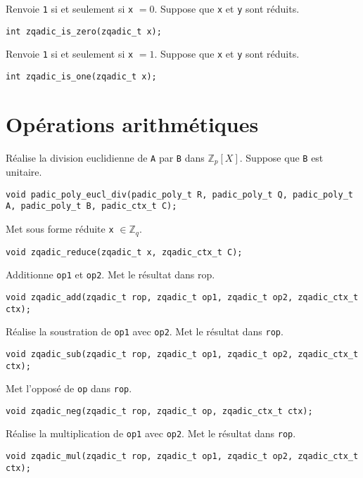 \documentclass[11pt]{article}
\begin{document}
Renvoie \texttt{1} si et seulement si \texttt{x} $= 0$. Suppose que \texttt{x} et \texttt{y} sont réduits.
\begin{verbatim}
int zqadic_is_zero(zqadic_t x);
\end{verbatim}

Renvoie \texttt{1} si et seulement si \texttt{x} $= 1$. Suppose que \texttt{x} et \texttt{y} sont réduits.
\begin{verbatim}
int zqadic_is_one(zqadic_t x);
\end{verbatim}


\section{Opérations arithmétiques}

Réalise la division euclidienne de \texttt{A} par \texttt{B} dans $\mathbb{Z}_p[X]$. Suppose que \texttt{B} est unitaire.
\begin{verbatim}
void padic_poly_eucl_div(padic_poly_t R, padic_poly_t Q, padic_poly_t A, padic_poly_t B, padic_ctx_t C);
\end{verbatim}

Met sous forme réduite \texttt{x} $\in \mathbb{Z}_q$.
\begin{verbatim}
void zqadic_reduce(zqadic_t x, zqadic_ctx_t C);
\end{verbatim}

Additionne \texttt{op1} et \texttt{op2}. Met le résultat dans rop.
\begin{verbatim}
void zqadic_add(zqadic_t rop, zqadic_t op1, zqadic_t op2, zqadic_ctx_t ctx);
\end{verbatim}

Réalise la soustration de \texttt{op1} avec \texttt{op2}. Met le résultat dans \texttt{rop}.
\begin{verbatim}
void zqadic_sub(zqadic_t rop, zqadic_t op1, zqadic_t op2, zqadic_ctx_t ctx);
\end{verbatim}

Met l'opposé de \texttt{op} dans \texttt{rop}.
\begin{verbatim}
void zqadic_neg(zqadic_t rop, zqadic_t op, zqadic_ctx_t ctx);
\end{verbatim}

Réalise la multiplication de \texttt{op1} avec \texttt{op2}. Met le résultat dans \texttt{rop}.
\begin{verbatim}
void zqadic_mul(zqadic_t rop, zqadic_t op1, zqadic_t op2, zqadic_ctx_t ctx);
\end{verbatim}
\end{document}
